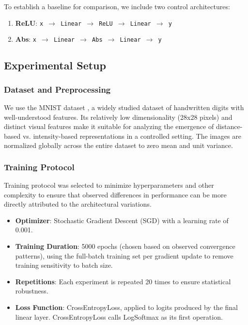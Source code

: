 To establish a baseline for comparison, we include two control architectures:

\begin{enumerate}
    \item \textbf{ReLU}: \texttt{x $\to$ Linear $\to$ ReLU $\to$ Linear $\to$ y}
    \item \textbf{Abs}: \texttt{x $\to$ Linear $\to$ Abs $\to$ Linear $\to$ y}
\end{enumerate}



\subsection{Experimental Setup}
\subsubsection{Dataset and Preprocessing}
We use the MNIST dataset \cite{lecun1998gradient}, a widely studied dataset of handwritten digits with well-understood features. Its relatively low dimensionality (28x28 pixels) and distinct visual features make it suitable for analyzing the emergence of distance-based vs. intensity-based representations in a controlled setting. The images are normalized globally across the entire dataset to zero mean and unit variance.

\subsubsection{Training Protocol}
Training protocol was selected to minimize hyperparameters and other complexity to ensure that observed differences in performance can be more directly attributed to the architectural variations.
\begin{itemize}
    \item \textbf{Optimizer}: Stochastic Gradient Descent (SGD) with a learning rate of 0.001.
    \item \textbf{Training Duration}: 5000 epochs (chosen based on observed convergence patterns), using the full-batch training set per gradient update to remove training sensitivity to batch size.
    \item \textbf{Repetitions}: Each experiment is repeated 20 times to ensure statistical robustness.
    \item \textbf{Loss Function}: CrossEntropyLoss, applied to logits produced by the final linear layer. CrossEntropyLoss calls LogSoftmax as its first operation.
\end{itemize}

